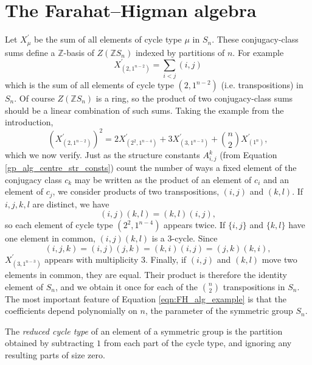 \section{The Farahat--Higman algebra} \label{FH_theory_section}

Let $X_{\mu}^\prime$ be the sum of all elements of cycle type $\mu$ in $S_n$. These conjugacy-class sums define a $\mathbb{Z}$-basis of $Z(\mathbb{Z}S_n)$ indexed by partitions of $n$. For example
\[
X_{(2,1^{n-2})}^\prime = \sum_{i<j} (i,j)
\]
which is the sum of all elements of cycle type $(2,1^{n-2})$ (i.e. transpositions) in $S_n$. Of course $Z(\mathbb{Z}S_n)$ is a ring, so the product of two conjugacy-class sums should be a linear combination of such sums. Taking the example from the introduction,
\begin{equation} \label{eqn:FH_alg_example}
(X_{(2,1^{n-2})}^\prime)^2 = 2X_{(2^2,1^{n-4})}^\prime + 3X_{(3,1^{n-3})}^\prime + \binom{n}{2}X_{(1^{n})}^\prime,
\end{equation}
which we now verify. Just as the structure constants $A_{i,j}^k$ (from Equation \eqref{gp_alg_centre_str_consts}) count the number of ways a fixed element of the conjugacy class $c_k$ may be written as the product of an element of $c_i$ and an element of $c_j$, we consider products of two transpositions, $(i,j)$ and $(k,l)$. 
If $i,j,k,l$ are distinct, we have
\[
(i,j)(k,l) = (k,l)(i,j),
\]
so each element of cycle type $(2^2,1^{n-4})$ appears twice. If $\{i,j\}$ and $\{k,l\}$ have one element in common, $(i,j)(k,l)$ is a 3-cycle. Since
\[
(i,j,k) = (i,j)(j,k) = (k,i)(i,j) = (j,k)(k,i),
\]
$X_{(3,1^{n-3})}^\prime$ appears with multiplicity 3. Finally, if $(i,j)$ and $(k,l)$ move two elements in common, they are equal. 
Their product is therefore the identity element of $S_n$, and we obtain it once for each of the $\binom{n}{2}$ transpositions in $S_n$. The most important feature of Equation \eqref{eqn:FH_alg_example} is that the coefficients depend polynomially on $n$, the parameter of the symmetric group $S_n$. 
\begin{definition}
The \emph{reduced cycle type} of an element of a symmetric group is the partition obtained by subtracting $1$ from each part of the cycle type, and ignoring any resulting parts of size zero. 
\end{definition}

